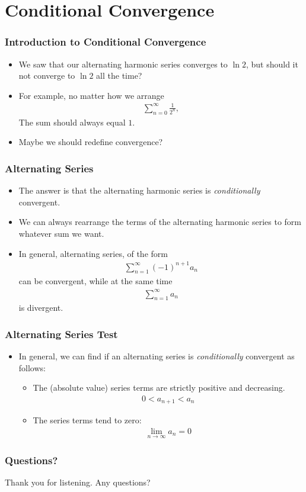 \documentclass{beamer}
\begin{document}
\section{Conditional Convergence}
\begin{frame}
  \frametitle{Introduction to Conditional Convergence}
  \begin{itemize}
    \item<1-> We saw that our alternating harmonic series converges to $\ln 2$, but should it not converge to $\ln 2$ all the time?
    \item<2-> For example, no matter how we arrange
      \begin{align*}
        \sum_{n=0}^{\infty}\frac{1}{2^n},
      \end{align*}
      The sum should always equal $1$.
    \item<3-> Maybe we should redefine convergence?
  \end{itemize}
\end{frame}
\begin{frame}
  \frametitle{Alternating Series}
  \begin{itemize}
    \item<1-> The answer is that the alternating harmonic series is \textit{conditionally} convergent.
    \item<2-> We can always rearrange the terms of the alternating harmonic series to form whatever sum we want.
    \item<3-> In general, alternating series, of the form
      \begin{align*}
        \sum_{n=1}^{\infty}(-1)^{n+1}a_n
      \end{align*}
      can be convergent, while at the same time
      \begin{align*}
        \sum_{n=1}^{\infty} a_n
      \end{align*}
      is divergent.
  \end{itemize}
\end{frame}
\begin{frame}
  \frametitle{Alternating Series Test}
  \begin{itemize}
    \item<1-> In general, we can find if an alternating series is \textit{conditionally} convergent as follows:
    \begin{itemize}
      \item<2-> The (absolute value) series terms are strictly positive and decreasing.
        \begin{align*}
          0 < a_{n+1} < a_n
        \end{align*}
      \item<3-> The series terms tend to zero:
        \begin{align*}
          \lim_{n\rightarrow\infty}a_n = 0
        \end{align*}
    \end{itemize}
  \end{itemize}
\end{frame}
\begin{frame}
  \frametitle{Questions?}
  Thank you for listening. Any questions?
\end{frame}
\end{document}
